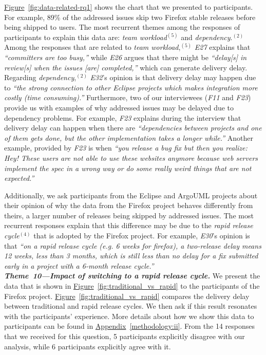 \hyperref[fig:data-related-rq1]{Figure}~\ref{fig:data-related-rq1} shows the
chart that we presented to participants. For example, 89\% of the addressed
issues skip two Firefox stable releases before being shipped to users. The most
recurrent themes among the responses of participants to explain this data are:
{\em team workload}$^{(5)}$ and {\em dependency}.$^{(2)}$ Among the responses that
are related to {\em team workload},$^{(5)}$ {\em E27} explains that {\em
``committers  are too busy,''} while {\em E26} argues that there might be {\em
``delay[s] in review[s] when the issues [are] completed,''} which can generate
delivery delay. Regarding {\em dependency},$^{(2)}$ {\em E32}'s opinion is
that delivery delay may happen due to {\em ``the strong connection to other
Eclipse projects which makes integration more costly (time consuming).''}
Furthermore, two of our interviewees ({\em F11} and {\em F23}) provide us with
examples of why addressed issues may be delayed due to dependency problems. For
example, {\em F23} explains during the interview that delivery delay can
happen when there are {\em ``dependencies between projects and one of them gets
done, but the other implementation takes a longer while.''} Another example,
provided by {\em F23} is when {\em ``you release a bug fix but then you realize:
	Hey! These users are not able to use these websites anymore because web
	servers implement the spec in a wrong way or do some really weird things
that are not expected.''}

Additionally, we ask participants from the Eclipse and ArgoUML projects about
their opinion of why the data from the Firefox project behaves differently from
theirs, \ie a larger number of releases being skipped by addressed issues. The
most recurrent responses explain that this difference may be due to the {\em
	rapid release cycle}$^{(4)}$ that is adopted by the Firefox project. For
	example, {\em E30}'s opinion is that {\em ``on a rapid release cycle
		(e.g. 6 weeks for firefox), a two-release delay means 12 weeks,
		less than 3 months, which is still less than no delay for a fix
		submitted early in a project with a 6-month release cycle.''} 
\\           

\noindent\textit{\textbf{Theme~10---Impact of switching to a rapid release
cycle.}}
We present the data that is shown in
\hyperref[fig:traditional_vs_rapid]{Figure}~\ref{fig:traditional_vs_rapid} to
the participants of the Firefox project.
\hyperref[fig:traditional_vs_rapid]{Figure}~\ref{fig:traditional_vs_rapid}
compares the delivery delay between traditional and rapid release cycles. We
then ask if this result resonates with the participants' experience. More
details about how we show this data to participants can be found in
\hyperref[methodology:ii]{Appendix}~\ref{methodology:ii}. From the 14 responses that we received for this
question, 5 participants explicitly disagree with our analysis, while 6
participants explicitly agree with it. 


